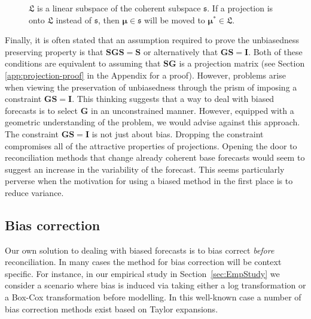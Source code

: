 \documentclass[12pt]{article}
\theoremstyle{definition}
\begin{document}
	\begin{figure}[H]
		\centering
		\vspace{-0.9cm}
		\small
		\resizebox{0.8\linewidth}{!}{
			
		}
		\caption{$\mathfrak{L}$ is a linear subspace of the coherent subspace $\mathfrak{s}$. If a projection is onto $\mathfrak{L}$ instead of $\mathfrak{s}$, then $\bm{\mu} \in \mathfrak{s}$ will be moved to $\bm{\mu}^* \in \mathfrak{L}$.}\label{fig:Schematic_3D}
	\end{figure}
	
	Finally, it is often stated that an assumption required to prove the unbiasedness preserving property is that $\bm{SGS}=\bm{S}$ or alternatively that $\bm{GS}=\bm{I}$.  Both of these conditions are equivalent to assuming that $\bm{SG}$ is a projection matrix (see Section \ref{app:projection-proof} in the Appendix for a proof). However, problems arise when viewing the preservation of unbiasedness through the prism of imposing a constraint $\bm{GS}=\bm{I}$. This thinking suggests that a way to deal with biased forecasts is to select $\bm{G}$ in an unconstrained manner.  However, equipped with a geometric understanding of the problem, we would advise against this approach.  The constraint $\bm{GS}=\bm{I}$  is not just about bias. Dropping the constraint compromises all of the attractive properties of projections.  Opening the door to reconciliation methods that change already coherent base forecasts would seem to suggest an increase in the variability of the forecast.  This seems particularly perverse when the motivation for using a biased method in the first place is to reduce variance.

    \subsection{Bias correction}
	
	Our own solution to dealing with biased forecasts is to bias correct {\em before} reconciliation.  In many cases the method for bias correction will be context specific.  For instance, in  our empirical study in Section~\ref{sec:EmpStudy} we consider a scenario where bias is induced via taking either a log transformation or a Box-Cox transformation before modelling.  In this well-known case a number of bias correction methods exist based on Taylor expansions. 
	
\end{document}
